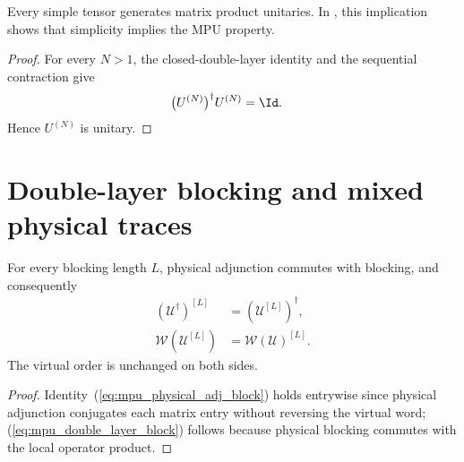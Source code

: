 \begin{lemma}
    \label{thm:mpu_simple_is_mpu}
    \leanok
    Every simple tensor generates matrix product unitaries.
    In \cite[Proposition~III.3(i)]{Cirac2017MPU}, this implication shows that simplicity implies the MPU property.
\end{lemma}

\begin{proof}\leanok
    For every $N>1$, the closed-double-layer identity and the sequential
    contraction give
    \begin{align}
        \bigl(U^{(N)}\bigr)^\dagger U^{(N)} & =\Id.
    \end{align}
    Hence $U^{(N)}$ is unitary.
\end{proof}

\section{Double-layer blocking and mixed physical traces}

\begin{lemma}
    \label{thm:mpu_double_layer_blocking}
    \leanok
    For every blocking length $L$, physical adjunction commutes with blocking,
    and consequently
    \begin{align}
        (\mathcal U^\dagger)^{[L]}   & =(\mathcal U^{[L]})^\dagger,
        \label{eq:mpu_physical_adj_block}                             \\
        \mathcal W(\mathcal U^{[L]}) & =\mathcal W(\mathcal U)^{[L]}.
        \label{eq:mpu_double_layer_block}
    \end{align}
    The virtual order is unchanged on both sides.
\end{lemma}

\begin{proof}\leanok
    Identity~(\ref{eq:mpu_physical_adj_block}) holds entrywise since physical adjunction
    conjugates each matrix entry without reversing the virtual word; (\ref{eq:mpu_double_layer_block})
    follows because physical blocking commutes with the local operator product.
\end{proof}

